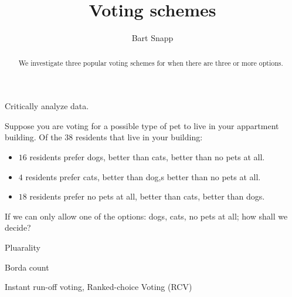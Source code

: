\documentclass[nooutcomes,noauthor,hints]{ximera}
\title{Voting schemes}
\author{Bart Snapp}
\begin{document}
\begin{abstract}
  We investigate three popular voting schemes for when there are three
  or more options.
\end{abstract}
\maketitle

\begin{listOutcomes}
\item Critically analyze data.
\end{listOutcomes}


Suppose you are voting for a possible type of pet to live in your
appartment building. Of the $38$ residents that live in your building:

\begin{itemize}
\item $16$ residents prefer dogs, better than cats, better than no pets at all.
\item $4$ residents prefer cats, better than dog,s better than no pets at all.
\item $18$ residents prefer no pets at all, better than cats, better
  than dogs.
\end{itemize}

If we can only allow one of the options: dogs, cats, no pets at all;
how shall we decide?



\mynewpage





\begin{question}
  Pluarality
  
\end{question}
\mynewpage



\begin{question} Borda count
\end{question}
\mynewpage



\begin{question}
  Instant run-off voting, Ranked-choice Voting (RCV) 
  
\end{question}
\end{document}
